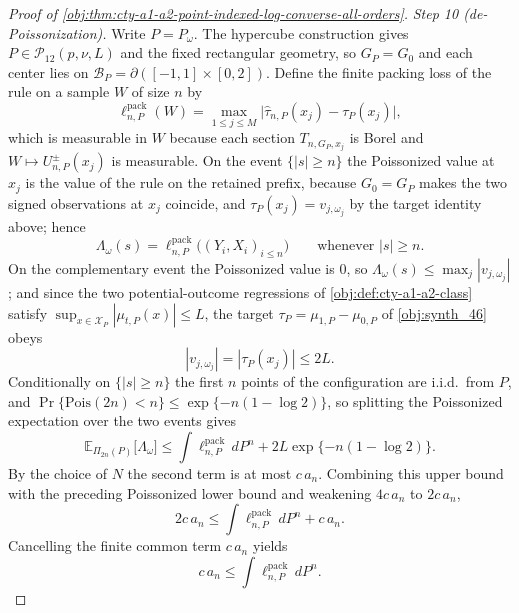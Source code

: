 \documentclass[11pt]{article}
\begin{document}
\begin{proof}[Proof of \cref{obj:thm:cty-a1-a2-point-indexed-log-converse-all-orders}]
\emph{Step 10 (de-Poissonization).}
Write \(P=P_\omega\).  The hypercube construction gives
\(P\in\mathcal P_{12}(p,\nu,L)\) and the fixed rectangular geometry, so
\(G_P=G_0\) and each center lies on
\(\mathcal B_P=\partial([-1,1]\times[0,2])\).  Define the finite packing loss of
the rule on a sample \(W\) of size \(n\) by
\[
\ell^{\mathrm{pack}}_{n,P}(W)
=\max_{1\leq j\leq M}
\bigl|\widehat\tau_{n,P}(x_j)-\tau_P(x_j)\bigr|,
\]
which is measurable in \(W\) because each section \(T_{n,G_P,x_j}\) is Borel and
\(W\mapsto U^{\pm}_{n,P}(x_j)\) is measurable.
On the event \(\{|s|\geq n\}\) the Poissonized value at \(x_j\) is the value of
the rule on the retained prefix, because \(G_0=G_P\) makes the two signed
observations at \(x_j\) coincide, and \(\tau_P(x_j)=v_{j,\omega_j}\) by the
target identity above; hence
\[
\Lambda_\omega(s)=\ell^{\mathrm{pack}}_{n,P}\bigl((Y_i,X_i)_{i\leq n}\bigr)
\qquad\text{whenever }|s|\geq n .
\]
On the complementary event the Poissonized value is \(0\), so
\(\Lambda_\omega(s)\leq\max_j|v_{j,\omega_j}|\); and since the two
potential-outcome regressions of \cref{obj:def:cty-a1-a2-class} satisfy
\(\sup_{x\in\mathcal X_P}|\mu_{t,P}(x)|\leq L\), the target
\(\tau_P=\mu_{1,P}-\mu_{0,P}\) of \cref{obj:synth_46} obeys
\[
|v_{j,\omega_j}|=|\tau_P(x_j)|\leq 2L .
\]
Conditionally on \(\{|s|\geq n\}\) the first \(n\) points of the configuration
are i.i.d.\ from \(P\), and \(\Pr\{\mathrm{Pois}(2n)<n\}\leq\exp\{-n(1-\log2)\}\),
so splitting the Poissonized expectation over the two events gives
\[
\mathbb E_{\Pi_{2n}(P)}\bigl[\Lambda_\omega\bigr]
\leq
\int \ell^{\mathrm{pack}}_{n,P}\,dP^n
+2L\exp\{-n(1-\log 2)\}.
\]
By the choice of \(N\) the second term is at most \(c\,a_n\).  Combining this
upper bound with the preceding Poissonized lower bound and weakening
\(4c\,a_n\) to \(2c\,a_n\),
\[
2c\,a_n\leq \int \ell^{\mathrm{pack}}_{n,P}\,dP^n+c\,a_n.
\]
Cancelling the finite common term \(c\,a_n\) yields
\[
c\,a_n\leq \int \ell^{\mathrm{pack}}_{n,P}\,dP^n .
\]


\end{proof}
\end{document}

